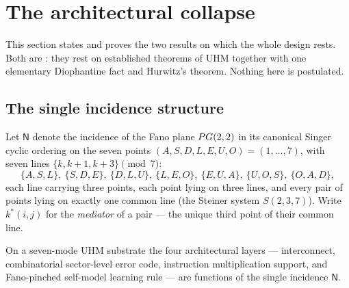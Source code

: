 \section{The architectural collapse}
\label{sec:collapse}

This section states and proves the two results on which the whole design
rests. Both are : they rest on established theorems of UHM
together with one elementary Diophantine fact and Hurwitz's theorem. Nothing
here is postulated.

\subsection{The single incidence structure}

Let $\mathsf{N}$ denote the incidence of the Fano plane $PG(2,2)$ in its canonical
Singer cyclic ordering on the seven points $(A,S,D,L,E,U,O) = (1,\dots,7)$, with
seven lines $\{k,k{+}1,k{+}3\}\pmod 7$:
\[
\{A,S,L\},\ \{S,D,E\},\ \{D,L,U\},\ \{L,E,O\},\ \{E,U,A\},\ \{U,O,S\},\ \{O,A,D\},
\]
each line carrying three points, each point lying on three lines, and every
pair of points lying on exactly one common line (the Steiner system
$S(2,3,7)$). Write $k^\ast(i,j)$ for the \emph{mediator} of a pair --- the
unique third point of their common line.

\begin{theorembox}
On a seven-mode UHM substrate the four architectural layers --- interconnect,
combinatorial sector-level error code, instruction multiplication support, and
Fano-pinched self-model learning rule --- are functions of the single incidence
$\mathsf{N}$.
\end{theorembox}

